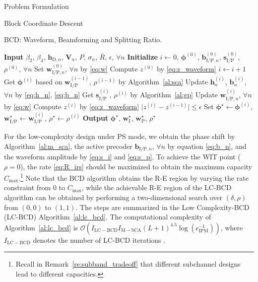 \documentclass[journal]{IEEEtran}
\begin{document}
\begin{section}{Problem Formulation}
\begin{subsection}{Block Coordinate Descent}
			\begin{algorithm}[!t]
				\caption{BCD: Waveform, Beamforming and Splitting Ratio.}
				\label{al:bcd}
				\begin{algorithmic}[1]
					\State \textbf{Input} $\beta_2$, $\beta_4$, $\boldsymbol{h}_{\mathrm{D},n}$, $\boldsymbol{V}_{n}$, $P$, $\sigma_n$, $\bar{R}$, $\epsilon$, $\forall n$
					\State \textbf{Initialize} $i \gets 0$, $\boldsymbol{\phi}^{(0)}$, $\boldsymbol{b}_{\mathrm{I/P},n}^{(0)}$, $\boldsymbol{s}_{\mathrm{I/P}}^{(0)}$, $\rho^{(0)}$, $\forall n$
					\State Set $\boldsymbol{w}_{\mathrm{I/P},n}^{(0)}$, $\forall n$ by \eqref{eq:w}
					\State Compute $z^{(0)}$ by \eqref{eq:z_waveform}
					\Repeat
						\State $i \gets i + 1$
						\State Get $\boldsymbol{\phi}^{(i)}$ based on $\boldsymbol{w}_{\mathrm{I/P}}^{(i-1)}$, $\rho^{(i-1)}$ by Algorithm~\ref{al:sca}
						\State Update $\boldsymbol{h}_n^{(i)}$, $\boldsymbol{b}_n^{(i)}$, $\forall n$ by \eqref{eq:h_n}, \eqref{eq:b_n}
						\State Get $\boldsymbol{s}_{\mathrm{I/P}}^{(i)}$, $\rho^{(i)}$ by Algorithm~\ref{al:gp}
						\State Update $\boldsymbol{w}_{\mathrm{I/P},n}^{(i)}$, $\forall n$ by \eqref{eq:w}
						\State Compute $z^{(i)}$ by \eqref{eq:z_waveform}
					\Until $\lvert z^{(i)} - z^{(i-1)} \rvert \le \epsilon$
					\State Set $\boldsymbol{\phi}^{\star} \gets \boldsymbol{\phi}^{(i)}$, $\boldsymbol{w}_{\mathrm{I/P}}^{\star} \gets \boldsymbol{w}_{\mathrm{I/P}}^{(i)}$, $\rho^{\star} \gets \rho^{(i)}$
					\State \textbf{Output} $\boldsymbol{\phi}^{\star}$, $\boldsymbol{w}_{\mathrm{I}}^{\star}$, $\boldsymbol{w}_{\mathrm{P}}^{\star}$, $\rho^{\star}$
				\end{algorithmic}
			\end{algorithm}

			For the low-complexity design under PS mode, we obtain the phase shift by Algorithm~\ref{al:m_sca}, the active precoder $\boldsymbol{b}_{\mathrm{I/P},n}$, $\forall n$ by equation \eqref{eq:b_n}, and the waveform amplitude by \eqref{eq:s_i} and \eqref{eq:s_p}. To achieve the WIT point ($\rho=0$), the rate \eqref{eq:R_irs} should be maximized to obtain the maximum capacity $C_{\max}$.\footnote{Recall in Remark~\ref{re:subband_tradeoff} that different subchannel designs lead to different capacities.} Note that the BCD algorithm obtains the R-E region by varying the rate constraint from \num{0} to $C_{\max}$, while the achievable R-E region of the LC-BCD algorithm can be obtained by performing a two-dimensional search over $(\delta, \rho)$ from $(0, 0)$ to $(1, 1)$. The steps are summarized in the Low Complexity-BCD (LC-BCD) Algorithm~\ref{al:lc_bcd}. The computational complexity of Algorithm~\ref{al:lc_bcd} is $\mathcal{O}\left(I_{\mathrm{LC-BCD}}I_{\mathrm{M-SCA}}(L+1)^{4.5} \log(\epsilon_{\mathrm{IPM}}^{-1})\right)$, where $I_{\mathrm{LC-BCD}}$ denotes the number of LC-BCD iterations \cite{Luo2010}.


\end{subsection}
\end{section}
\end{document}
